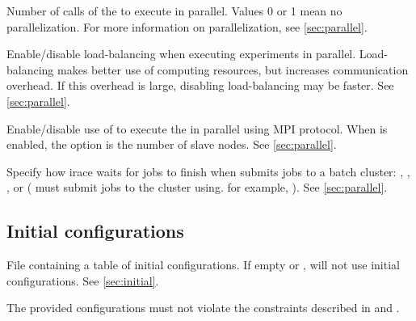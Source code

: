 \begin{description}
Number of calls of the  to execute in parallel. Values  0 or 1 mean no parallelization. For more information on parallelization, see \autoref{sec:parallel}.

  Enable/disable load-balancing when executing experiments in parallel. Load-balancing makes better use of computing resources, but increases communication overhead. If this overhead is large, disabling load-balancing may be faster. See \autoref{sec:parallel}.

  Enable/disable use of  to execute the  in parallel using MPI protocol. When  is enabled, the option  is the number of slave nodes. See \autoref{sec:parallel}.

  Specify how irace waits for jobs to finish when  submits jobs to a batch cluster: , , ,  or  ( must submit jobs to the cluster using. for example, ). See \autoref{sec:parallel}.

\end{description}

\subsection[Initial configurations]{Initial configurations}
\begin{description}
File containing a table of initial configurations. If empty or , \irace will not use initial configurations. See \autoref{sec:initial}.
\begin{xwarningbox}
The provided configurations must not violate the constraints described in  and .
\end{xwarningbox}

\end{description}

